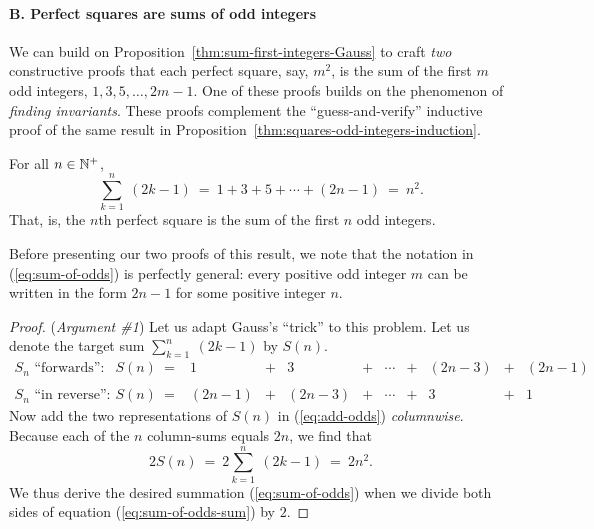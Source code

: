 \medskip


\paragraph{B. Perfect squares are sums of odd integers}

We can build on Proposition~\ref{thm:sum-first-integers-Gauss} to
craft {\em two} constructive proofs that each perfect square, say,
$m^2$, is the sum of the first $m$ odd integers, $1, 3, 5, \ldots,
2m-1$.  One of these proofs builds on the phenomenon of {\em finding
  invariants}.  These proofs complement the ``guess-and-verify''
inductive proof of the same result in
Proposition~\ref{thm:squares-odd-integers-induction}.

\begin{prop}
\label{thm:squares-odd-integers-Gauss}
For all $n \in \mathbb{N}^+$,
\begin{equation}
\label{eq:sum-of-odds}
\sum_{k=1}^n \ (2k-1)
 \ = \ 1 + 3 + 5 + \cdots + (2n-1) \ = \ n^2.
\end{equation}
That, is, the $n$th perfect square is the sum of the first $n$ odd
integers.
\end{prop}

Before presenting our two proofs of this result, we note that the
notation in (\ref{eq:sum-of-odds}) is perfectly general: every positive
odd integer $m$ can be written in the form $2n-1$ for some positive
integer $n$.

\smallskip

\begin{proof}
({\it Argument \#1})
%
Let us adapt Gauss's ``trick'' to this problem.  Let us denote the
target sum $\sum_{k=1}^n \ (2k-1)$ by $S(n)$. 
\begin{equation}
\label{eq:add-odds}
\begin{array}{llccccccccc}
\mbox{$S_n$ ``forwards'':} &
S(n) \ = 
& 1 & + & 3 & + & \cdots & + & (2n-3) & + & (2n-1) \\
 & & & & & & & & & &  \\
\mbox{$S_n$ ``in reverse'':} &
S(n) \ =
& (2n-1) & + & (2n-3) & + & \cdots & + & 3 & + & 1
\end{array}
\end{equation}
Now add the two representations of $S(n)$ in (\ref{eq:add-odds}) {\em
  columnwise}.  Because each of the $n$ column-sums equals $2n$, we
find that
\begin{equation}
\label{eq:sum-of-odds-sum}
2 S(n) \ = \ 2 \sum_{k=1}^n \ (2k-1) \ = \ 2n^2.
\end{equation}
We thus derive the desired summation (\ref{eq:sum-of-odds}) when we
divide both sides of equation (\ref{eq:sum-of-odds-sum}) by $2$.
\end{proof}

